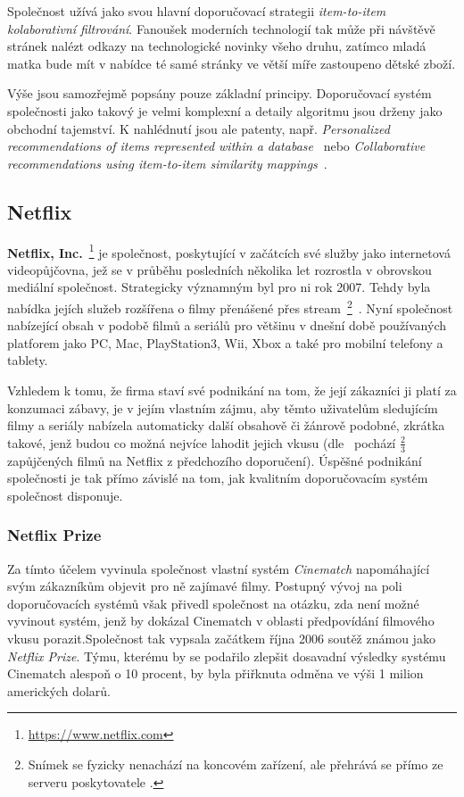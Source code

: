 \documentclass[thesis=M,czech]{FITthesis}[2014/05/07]
\begin{document}
Společnost užívá jako svou hlavní doporučovací strategii \emph{item-to-item kolaborativní filtrování}. Fanoušek moderních technologií tak může při návštěvě stránek nalézt odkazy na technologické novinky všeho druhu, zatímco mladá matka bude mít v nabídce té samé stránky ve větší míře zastoupeno dětské zboží.
 
Výše jsou samozřejmě popsány pouze základní principy. Doporučovací systém společnosti jako takový je velmi komplexní a detaily algoritmu jsou drženy jako obchodní tajemství. K nahlédnutí jsou ale patenty, např. \emph{Personalized recommendations of items represented within a database}~\cite{jacobi2006personalized} nebo \emph{Collaborative recommendations using item-to-item similarity mappings}~\cite{linden2001collaborative}.

\subsection{Netflix}

\textbf{Netflix, Inc.}~\footnote{\url{https://www.netflix.com}} je společnost, poskytující v začátcích své služby jako internetová videopůjčovna, jež se v průběhu posledních několika let rozrostla v obrovskou mediální společnost. Strategicky významným byl pro ni rok 2007. Tehdy byla nabídka jejích služeb rozšířena o filmy přenášené přes stream~\footnote{Snímek se fyzicky nenachází na koncovém zařízení, ale přehrává se přímo ze serveru poskytovatele .}~\cite{netflix2007}. Nyní společnost nabízející obsah v podobě filmů a seriálů pro většinu v dnešní době používaných platforem jako PC, Mac, PlayStation3, Wii, Xbox a také pro mobilní telefony a tablety. 

Vzhledem k tomu, že firma staví své podnikání na tom, že její zákazníci ji platí za konzumaci zábavy, je v jejím vlastním zájmu, aby těmto uživatelům sledujícím filmy a seriály nabízela automaticky další obsahově či žánrově podobné, zkrátka takové, jenž budou co možná nejvíce lahodit jejich vkusu (dle~\cite{netflixrec} pochází $\frac{2}{3}$ zapůjčených filmů na Netflix z předchozího doporučení). Úspěšné podnikání společnosti je tak přímo závislé na tom, jak kvalitním doporučovacím systém společnost disponuje. 

\subsubsection{Netflix Prize}

\cite{netflixrules} Za tímto účelem vyvinula společnost vlastní systém \emph{Cinematch} napomáhající svým zákazníkům objevit pro ně zajímavé filmy. Postupný vývoj na poli doporučovacích systémů však přivedl společnost na otázku, zda není možné vyvinout systém, jenž by dokázal Cinematch v oblasti předpovídání filmového vkusu porazit.Společnost tak vypsala začátkem října 2006 soutěž známou jako \emph{Netflix Prize}. Týmu, kterému by se podařilo zlepšit dosavadní výsledky systému Cinematch alespoň o 10 procent, by byla přiřknuta odměna ve výši 1 milion amerických dolarů.
\end{document}
